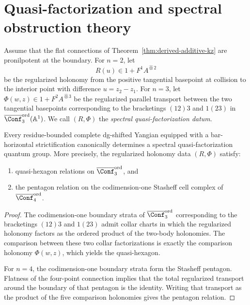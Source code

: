 \section{Quasi-factorization and spectral obstruction theory}

\begin{definition}
Assume that the flat connections of
Theorem~\ref{thm:derived-additive-kz} are pronilpotent at the boundary.
For $n=2$, let
\[
R(u)\in 1+F^1A^{\widehat\otimes 2}
\]
be the regularized holonomy from the positive tangential basepoint at
collision to the interior point with difference $u=z_2-z_1$.
For $n=3$, let $\Phi(w,z)\in 1+F^2A^{\widehat\otimes 3}$ be the
regularized parallel transport between the two tangential basepoints
corresponding to the bracketings $(12)3$ and $1(23)$ in
$\overline{\Conf}_3^{\mathrm{ord}}(\mathbb A^1)$.
We call $(R,\Phi)$ the \emph{spectral quasi-factorization datum}.
\end{definition}

\begin{theorem}
\label{thm:quasi-factorization}
Every residue-bounded complete dg-shifted Yangian equipped with a
bar-horizontal strictification canonically determines a spectral
quasi-factorization quantum group.
More precisely, the regularized holonomy data $(R,\Phi)$ satisfy:
\begin{enumerate}
\item quasi-hexagon relations on $\overline{\Conf}_3^{\mathrm{ord}}$, and
\item the pentagon relation on the codimension-one Stasheff cell complex
 of $\overline{\Conf}_4^{\mathrm{ord}}$.
\end{enumerate}
\end{theorem}

\begin{proof}
The codimension-one boundary strata of
$\overline{\Conf}_3^{\mathrm{ord}}$ corresponding to the bracketings
$(12)3$ and $1(23)$ admit collar charts in which the regularized
holonomy factors as the ordered product of the two-body holonomies.
The comparison between these two collar factorizations is exactly the
comparison holonomy $\Phi(w,z)$, which yields the quasi-hexagon.

For $n=4$, the codimension-one boundary strata form the Stasheff
pentagon. Flatness of the four-point connection implies that the total
regularized transport around the boundary of that pentagon is the
identity. Writing that transport as the product of the five comparison
holonomies gives the pentagon relation.
\end{proof}

